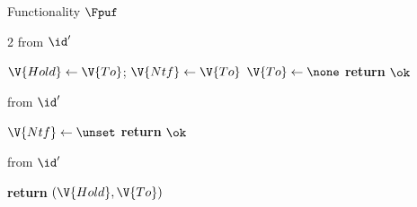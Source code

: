 \begin{interface}[nofloat]{Functionality $\Fpuf$ \\
}
{\begin{multicols}{2}
 \quad from $\id'$
\begin{algorithmic}[1]
\algcont
{} \label{ln:pufsched}
\State $\V{Hold} \gets \V{To}$; \quad $\V{Ntf} \gets \V{To}$
\State $\V{To} \gets \none$
\State \textbf{return} $\ok$
\algsave
\end{algorithmic}
\vspace{1.4ex}

 \quad from $\id'$
\begin{algorithmic}[1]
\algcont
{}
\State $\V{Ntf} \gets \unset$
\State \textbf{return} $\ok$
\algsave
\end{algorithmic}
\vspace{1.4ex}

 \quad from $\id'$
\begin{algorithmic}[1]
\algcont
\State \textbf{return} $(\V{Hold}, \V{To})$ \label{ln:pufleak}
\algsave
\end{algorithmic}
\end{multicols}}
\end{interface}
